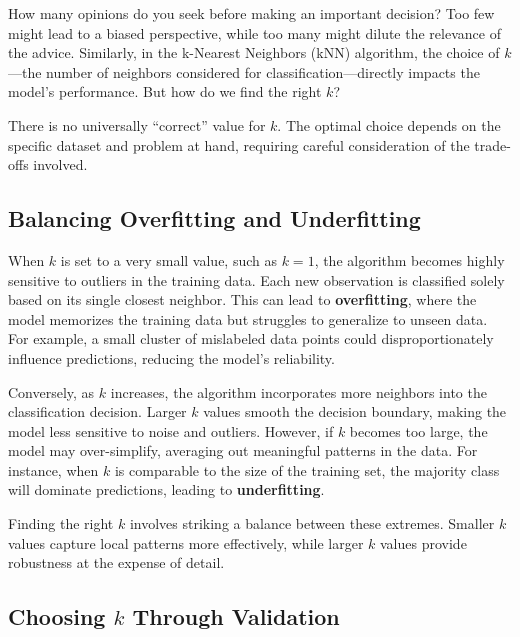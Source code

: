 \documentclass[
]{book}
\theoremstyle{definition}
\theoremstyle{definition}
\theoremstyle{definition}
\theoremstyle{definition}
\theoremstyle{remark}
\begin{document}
How many opinions do you seek before making an important decision? Too few might lead to a biased perspective, while too many might dilute the relevance of the advice. Similarly, in the k-Nearest Neighbors (kNN) algorithm, the choice of \(k\)---the number of neighbors considered for classification---directly impacts the model's performance. But how do we find the right \(k\)?

There is no universally ``correct'' value for \(k\). The optimal choice depends on the specific dataset and problem at hand, requiring careful consideration of the trade-offs involved.

\subsection*{Balancing Overfitting and Underfitting}\label{balancing-overfitting-and-underfitting}

When \(k\) is set to a very small value, such as \(k = 1\), the algorithm becomes highly sensitive to outliers in the training data. Each new observation is classified solely based on its single closest neighbor. This can lead to \textbf{overfitting}, where the model memorizes the training data but struggles to generalize to unseen data. For example, a small cluster of mislabeled data points could disproportionately influence predictions, reducing the model's reliability.

Conversely, as \(k\) increases, the algorithm incorporates more neighbors into the classification decision. Larger \(k\) values smooth the decision boundary, making the model less sensitive to noise and outliers. However, if \(k\) becomes too large, the model may over-simplify, averaging out meaningful patterns in the data. For instance, when \(k\) is comparable to the size of the training set, the majority class will dominate predictions, leading to \textbf{underfitting}.

Finding the right \(k\) involves striking a balance between these extremes. Smaller \(k\) values capture local patterns more effectively, while larger \(k\) values provide robustness at the expense of detail.

\subsection*{\texorpdfstring{Choosing \(k\) Through Validation}{Choosing k Through Validation}}\label{choosing-k-through-validation}
\end{document}
